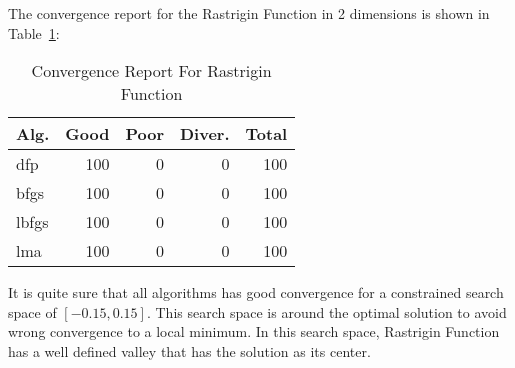 
The convergence report for the Rastrigin Function in 2 dimensions is shown in Table~\ref{convergence:rastrigin30d}:

\begin{table}[H]
\centering
\caption{Convergence Report For Rastrigin Function}
\label{convergence:rastrigin30d}
\begin{tabular}{lrrrr}
\toprule
 Alg. &  Good &  Poor &  Diver. &  Total \\
\midrule
  dfp &   100 &     0 &       0 &    100 \\
 bfgs &   100 &     0 &       0 &    100 \\
lbfgs &   100 &     0 &       0 &    100 \\
  lma &   100 &     0 &       0 &    100 \\
\bottomrule
\end{tabular}
\end{table}


It is quite sure that all algorithms has good convergence for a
constrained search space of $\left[-0.15, 0.15\right]$. This search space is around
the optimal solution to avoid wrong convergence to a local minimum. In this search space,
Rastrigin Function has a well defined valley that has the solution as its center.